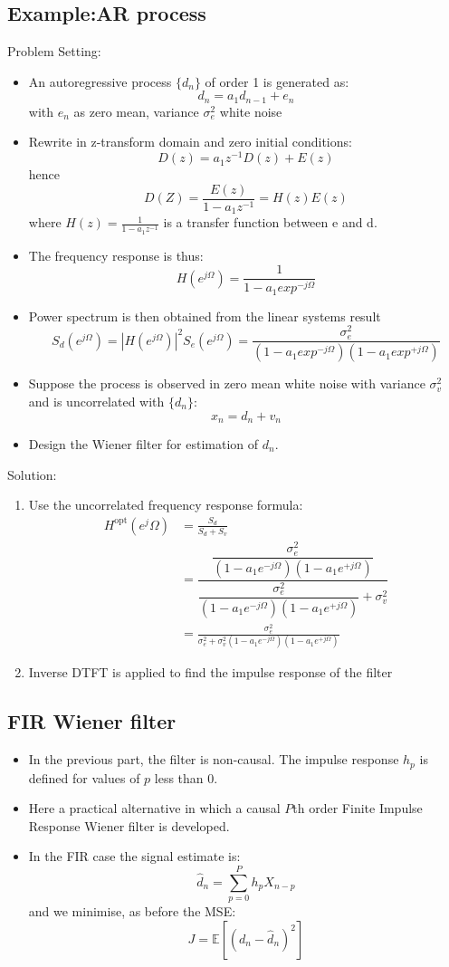 \documentclass[12pt]{article}
\newcommand{\sigd}{\sigma^2}
\newcommand{\mexp}{\mathbb{E}}
\newcommand{\summ}[2]{\sum_{#1}^{#2}}
\newcommand{\sumpzerop}{\summ{p=0}{P}}
\newcommand{\proc}[1]{\{ #1_n\}}
\newcommand{\desest}{\hat{d}_n}
\newcommand{\des}{d_n}
\newcommand{\opt}{\textrm{opt}}
\begin{document}
\subsection{Example:AR process}
Problem Setting:
\begin{itemize}
    \item An autoregressive process $\proc{d}$ of order 1 is generated as:
\[
d_n = a_1 d_{n-1} +e_n
\]
with $e_n$ as zero mean, variance $\sigd_e$ white noise 
\item Rewrite in z-transform domain and zero initial conditions:
\[
D(z) = a_1 z^{-1}D(z) + E(z)
\]
hence 
\[
D(Z) = \frac{E(z)}{1-a_1 z^{-1}} = H(z)E(z)
\]
where $H(z) = \frac{1}{1- a_1 z^{-1}}$ is a transfer function between e and d.
\item The frequency response is thus:
\[
H(e^{j\Omega}) = \frac{1}{1- a_1 exp^{-j\Omega}}
\]
\item Power spectrum is then obtained from the linear systems result
\[
S_d(e^{j\Omega}) = |H(e^{j\Omega})|^2 S_e(e^{j\Omega}) = \frac{\sigd_e}{(1- a_1 exp^{-j\Omega})(1- a_1 exp^{+j\Omega})}
\]
\item Suppose the process is observed in zero mean white noise with variance $\sigd_v$ and is uncorrelated with $\proc{d}$:
\[
x_n = d_n + v_n
\]
\item Design the Wiener filter for estimation of $d_n$.
\end{itemize}
Solution:
\begin{enumerate}
    \item Use the uncorrelated frequency response formula:
    \begin{align*}
        H^{\opt} (e^j\Omega) &= \frac{S_d}{S_d + S_v} \\
        &= \dfrac{\dfrac{\sigd_e}{(1- a_1 e^{-j\Omega})(1- a_1 e^{+j\Omega})}}{\dfrac{\sigd_e}{(1- a_1 e^{-j\Omega})(1- a_1 e^{+j\Omega})} + \sigd_v} \\ 
        &= \frac{\sigd_e}{\sigd_e + \sigd_v(1- a_1 e^{-j\Omega})(1- a_1 e^{+j\Omega}) } 
    \end{align*}
    \item Inverse DTFT is applied to find the impulse response of the filter
\end{enumerate}

\subsection{FIR Wiener filter}
\begin{itemize}
    \item In the previous part, the filter is non-causal. The impulse response $h_p$ is defined for values of $p$ less than 0. 
    \item Here a practical alternative in which a causal $P$th order Finite Impulse Response Wiener filter is developed.
    \item In the FIR case the signal estimate is:
    \[
    \desest = \sumpzerop h_p X_{n-p}
    \]
    and we minimise, as before the MSE:
    \[
    J = \mexp[(\des - \desest)^2]
    \]
    \end{itemize}
\end{document}

